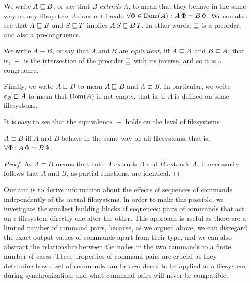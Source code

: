 \begin{mydef}
We write $A\sqsubseteq B$, or say that $B$ \emph{extends} $A$,
to mean that they behave in the same way
on any filesystem $A$ does not break:
$\forall \Phi\in\textrm{Dom}({A}):\,A\,\Phi=B\,\Phi$.
We can also see that $A\sqsubseteq B$ and $S\sqsubseteq T$ implies $A\, S\sqsubseteq B\, T$.
In other words, $\sqsubseteq$ is a preorder, and also a precongruence.

We write $A\equiv B$,
or say that $A$ and $B$ are \emph{equivalent,}
iff $A\sqsubseteq B$ and $B\sqsubseteq A$;
that is, $\equiv$ is the intersection of the preorder $\sqsubseteq$ with its inverse,
and so it is a congruence.

Finally, we write $A\sqsubset B$ to mean $A\sqsubseteq B$ and $A\nequiv B$.
In particular, we write $\epsilon_\varnothing\sqsubset{A}$
to mean that $\textrm{Dom}({A})$ is not empty, that is, if $A$ is defined on some filesystems.
\end{mydef}

It is easy to see that the equivalence $\equiv$ holds on the level of filesystems:
\begin{mylem}
$A\equiv B$
iff $A$ and $B$ behave in the same way on
all filesystems, that is, $\forall \Phi: A\,\Phi=B\,\Phi$.
\end{mylem}
\begin{proof}
As $A\equiv B$ means that both $A$ extends $B$ and $B$ extends $A$, it necessarily
follows that $A$ and $B$, as partial functions, are identical.
\end{proof}


\myskip
Our aim is to derive information about the effects of sequences
of commands independently of the actual filesystems.
In order to make this possible, we investigate the smallest building
blocks of sequences: pairs of commands that act on a filesystem directly one after the other.
This approach is useful as there are a limited number of command pairs,
because, as we argued above, we can disregard the exact output values of commands apart from their type,
and we can also abstract the relationship between the nodes in the two commands
to a finite number of cases.
These properties of command pairs are crucial as they determine
how a set of commands can be re-ordered to be applied to a filesystem
during synchronization, and what command pairs will never be compatible.

